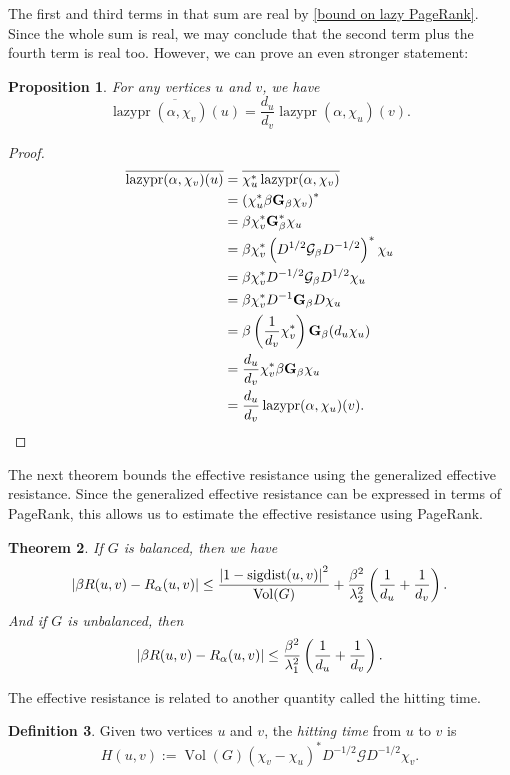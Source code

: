 \documentclass[12pt]{article}
\newtheorem{thm}{Theorem}
\newtheorem{prop}[thm]{Proposition}
\theoremstyle{definition}
\newtheorem{defn}[thm]{Definition}
\DeclarePairedDelimiter\abs{\lvert}{\rvert}
\DeclareMathOperator{\lazypr}{lazypr}
\DeclareMathOperator{\sigdist}{sigdist}
\DeclareMathOperator{\vol}{Vol}
\newcommand{\green}{\mathcal{G}}
\newcommand{\asymgreen}{\normalfont{\textbf{G}}}
\begin{document}
The first and third terms in that sum are real by \cref{bound on lazy PageRank}. Since the whole sum is real, we may conclude that the second term plus the fourth term is real too. However, we can prove an even stronger statement:

\begin{prop}
For any vertices $u$ and $v$, we have
$$
\overline{\lazypr(\alpha, \chi_v)(u)} = \frac{d_u}{d_v} \lazypr(\alpha, \chi_u)(v).
$$
\end{prop}
\begin{proof}
\begin{align*}
\overline{\lazypr(\alpha, \chi_v)(u)} &= \overline{\chi_u^* \lazypr(\alpha, \chi_v)} \\
&= \left( \chi_u^* \beta \asymgreen_\beta \chi_v \right)^* \\
&= \beta \chi_v^* \asymgreen_\beta^* \chi_u \\
&= \beta \chi_v^* \left( D^{1/2} \green_\beta D^{-1/2} \right)^* \chi_u \\
&= \beta \chi_v^* D^{-1/2} \green_\beta D^{1/2} \chi_u \\
&= \beta \chi_v^* D^{-1} \asymgreen_\beta D \chi_u \\
&= \beta \left( \frac{1}{d_v} \chi_v^* \right) \asymgreen_\beta (d_u \chi_u) \\
&= \frac{d_u}{d_v} \chi_v^* \beta \asymgreen_\beta \chi_u \\
&= \frac{d_u}{d_v} \lazypr(\alpha, \chi_u)(v).
\end{align*}
\end{proof}

The next theorem bounds the effective resistance using the generalized effective resistance. Since the generalized effective resistance can be expressed in terms of PageRank, this allows us to estimate the effective resistance using PageRank.

\begin{thm}
If $G$ is balanced, then we have
$$
\abs*{\beta R(u, v) - R_\alpha (u, v)}
\leq \frac{\abs*{1 - \sigdist(u, v)}^2}{\vol(G)} + \frac{\beta^2}{\lambda_2^2}\left( \frac{1}{d_u} + \frac{1}{d_v} \right).
$$
And if $G$ is unbalanced, then
$$
\abs*{\beta R(u, v) - R_\alpha (u, v)}
\leq \frac{\beta^2}{\lambda_1^2}\left( \frac{1}{d_u} + \frac{1}{d_v} \right).
$$
\end{thm}

The effective resistance is related to another quantity called the hitting time.

\begin{defn}
Given two vertices $u$ and $v$, the \textit{hitting time} from $u$ to $v$ is 
$$
H(u, v) := \vol(G) (\chi_v - \chi_u)^* D^{-1/2} \green D^{-1/2} \chi_v.
$$  
\end{defn}
\end{document}
